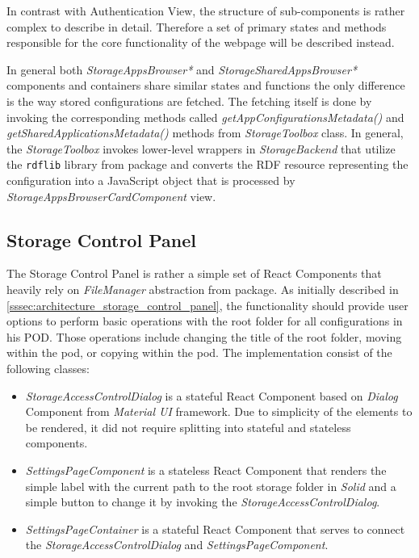 In contrast with Authentication View, the structure of sub-components is rather complex to describe in detail. Therefore a set of primary states and methods responsible for the core functionality of the webpage will be described instead.

In general both \textit{StorageAppsBrowser*} and \textit{StorageSharedAppsBrowser*} components and containers share similar states and functions the only difference is the way stored \lpa{} configurations are fetched. The fetching itself is done by invoking the corresponding methods called \textit{getAppConfigurationsMetadata()} and \textit{getSharedApplicationsMetadata()} methods from \textit{StorageToolbox} class. In general, the \textit{StorageToolbox} invokes lower-level wrappers in \textit{StorageBackend} that utilize the \texttt{rdflib} library from \lpas{} package and converts the RDF resource representing the \lpa{} configuration into a JavaScript object that is processed by \textit{StorageAppsBrowserCardComponent} view.

\subsection{Storage Control Panel}
\label{sssec:storage_control_panel_implementation}

The Storage Control Panel is rather a simple set of React Components that heavily rely on \textit{FileManager} abstraction from \lpas{} package. As initially described in \autoref{sssec:architecture_storage_control_panel}, the functionality should provide user options to perform basic operations with the root folder for all \lpa{} configurations in his \solid{} POD. Those operations include changing the title of the root folder, moving within the pod, or copying within the pod. The implementation consist of the following classes:
\begin{itemize}
    \item \textit{StorageAccessControlDialog} is a stateful React Component based on \textit{Dialog} Component from \textit{Material UI} framework. Due to simplicity of the elements to be rendered, it did not require splitting into stateful and stateless components.
    \item \textit{SettingsPageComponent} is a stateless React Component that renders the simple label with the current path to the root storage folder in \textit{Solid} and a simple button to change it by invoking the \textit{StorageAccessControlDialog}.
    \item \textit{SettingsPageContainer} is a stateful React Component that serves to connect the \textit{StorageAccessControlDialog} and \textit{SettingsPageComponent}.
\end{itemize}

